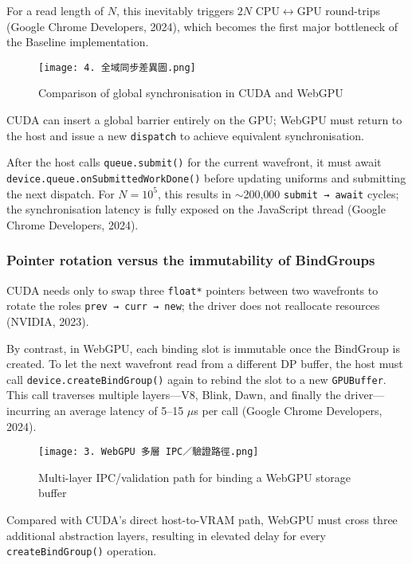 \documentclass[PhD]{PHlab-thesis}
\begin{document}
For a read length of $N$, this inevitably triggers $2N$ CPU$\leftrightarrow$GPU round-trips (Google Chrome Developers, 2024), which becomes the first major bottleneck of the Baseline implementation.

\begin{figure}[htbp]
    \centering
    \texttt{[image: 4. 全域同步差異圖.png]}
    \caption{Comparison of global synchronisation in CUDA and WebGPU}
    \label{fig:global-sync-diff}
\end{figure}

CUDA can insert a global barrier entirely on the GPU; WebGPU must return to the host and issue a new \texttt{dispatch} to achieve equivalent synchronisation.

After the host calls \texttt{queue.submit()} for the current wavefront, it must await \texttt{device.queue.onSubmittedWorkDone()} before updating uniforms and submitting the next dispatch.  
For $N = 10^{5}$, this results in $\sim$200{,}000 \texttt{submit → await} cycles; the synchronisation latency is fully exposed on the JavaScript thread (Google Chrome Developers, 2024).

\subsubsection{Pointer rotation versus the immutability of BindGroups}
CUDA needs only to swap three \texttt{float*} pointers between two wavefronts to rotate the roles \texttt{prev → curr → new}; the driver does not reallocate resources (NVIDIA, 2023).

By contrast, in WebGPU, each binding slot is immutable once the BindGroup is created. To let the next wavefront read from a different DP buffer, the host must call \texttt{device.createBindGroup()} again to rebind the slot to a new \texttt{GPUBuffer}.  
This call traverses multiple layers—V8, Blink, Dawn, and finally the driver—incurring an average latency of 5–15 $\mu$s per call (Google Chrome Developers, 2024).

\begin{figure}[htbp]
    \centering
    \texttt{[image: 3. WebGPU 多層 IPC／驗證路徑.png]}
    \caption{Multi-layer IPC/validation path for binding a WebGPU storage buffer}
    \label{fig:webgpu-ipc-validation}
\end{figure}

Compared with CUDA's direct host-to-VRAM path, WebGPU must cross three additional abstraction layers, resulting in elevated delay for every \texttt{createBindGroup()} operation.
\end{document}
